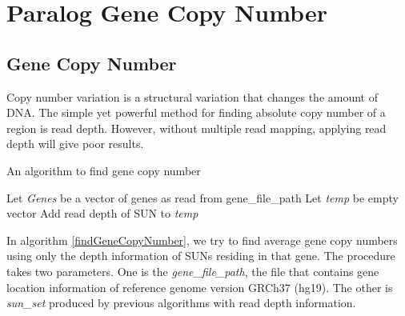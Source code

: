 \section{Paralog Gene Copy Number}

\subsection{Gene Copy Number}
Copy number variation is a structural variation that changes the amount of DNA. The simple yet powerful method for finding absolute copy number of a region is read depth. However, without multiple read mapping, applying read depth will give poor results.

\begin{algorithm}
\caption{An algorithm to find gene copy number}
\label{findGeneCopyNumber}
\begin{algorithmic}[1]
\State Let \textit{Genes} be a vector of genes as read from gene\_file\_path
\State Let \textit{temp} be empty vector
\State Add read depth of SUN to \textit{temp}
\EndIf
\EndFor
{}
\EndIf
\EndFor
\EndProcedure
\end{algorithmic}
\end{algorithm}

In algorithm \ref{findGeneCopyNumber}, we try to find average gene copy numbers using only the depth information of SUNs residing in that gene. The procedure takes two parameters. One is the \textit{gene\_file\_path}, the file that contains gene location information of reference genome version GRCh37 (hg19). The other is \textit{sun\_set} produced by previous algorithms with read depth information.

